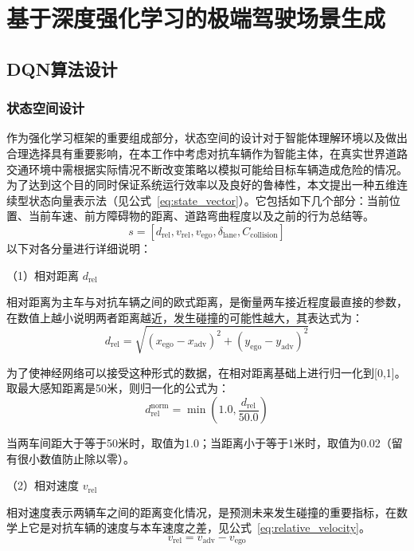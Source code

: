 \chapter{基于深度强化学习的极端驾驶场景生成}
\section{DQN算法设计}
\subsection{状态空间设计}
作为强化学习框架的重要组成部分，状态空间的设计对于智能体理解环境以及做出合理选择具有重要影响，在本工作中考虑对抗车辆作为智能主体，在真实世界道路交通环境中需根据实际情况不断改变策略以模拟可能给目标车辆造成危险的情况。为了达到这个目的同时保证系统运行效率以及良好的鲁棒性，本文提出一种五维连续型状态向量表示法（见公式~\ref{eq:state_vector}）。它包括如下几个部分：当前位置、当前车速、前方障碍物的距离、道路弯曲程度以及之前的行为总结等\cite{almahamid2025agile}。
\begin{equation}
s = \left[ d_{\text{rel}}, v_{\text{rel}}, v_{\text{ego}}, \delta_{\text{lane}}, C_{\text{collision}} \right]
\label{eq:state_vector}
\end{equation}
以下对各分量进行详细说明：

（1）相对距离 $d_{\text{rel}}$

相对距离为主车与对抗车辆之间的欧式距离，是衡量两车接近程度最直接的参数，在数值上越小说明两者距离越近，发生碰撞的可能性越大，其表达式为：
\begin{equation}
d_{\text{rel}} = \sqrt{(x_{\text{ego}} - x_{\text{adv}})^2 + (y_{\text{ego}} - y_{\text{adv}})^2}
\label{eq:relative_distance}
\end{equation}

为了使神经网络可以接受这种形式的数据，在相对距离基础上进行归一化到[0,1]。取最大感知距离是50米，则归一化的公式为：
\begin{equation}
d_{\text{rel}}^{\text{norm}} = \min\left(1.0, \frac{d_{\text{rel}}}{50.0}\right)
\label{eq:normalized_distance}
\end{equation}

当两车间距大于等于50米时，取值为1.0；当距离小于等于1米时，取值为0.02（留有很小数值防止除以零）。

（2）相对速度 $v_{\text{rel}}$

相对速度表示两辆车之间的距离变化情况，是预测未来发生碰撞的重要指标，在数学上它是对抗车辆的速度与本车速度之差，见公式~\ref{eq:relative_velocity}。
\begin{equation}
v_{\text{rel}} = v_{\text{adv}} - v_{\text{ego}}
\label{eq:relative_velocity}
\end{equation}

